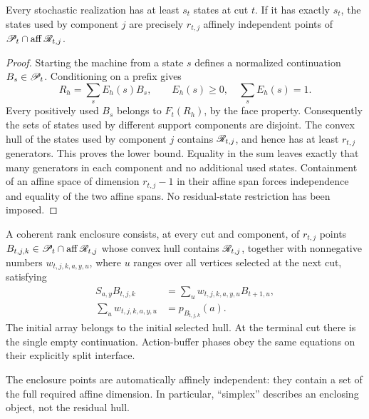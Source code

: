 \begin{lemma}\label{lem:separated}
Every stochastic realization has at least $s_t$ states at cut $t$.
If it has exactly $s_t$, the states used by component $j$ are precisely
$r_{t,j}$ affinely independent points of
$\mathscr P_t\cap\operatorname{aff}\mathscr R_{t,j}$.
\end{lemma}
\begin{proof}
Starting the machine from a state $s$ defines a normalized continuation
$B_s\in\mathscr P_t$. Conditioning on a prefix gives
\[
 R_h=\sum_s E_h(s)B_s,\qquad E_h(s)\ge0,\quad\sum_sE_h(s)=1.
\]
Every positively used $B_s$ belongs to $F_t(R_h)$, by the face property.
Consequently the sets of states used by different support components
are disjoint. The convex hull of the states used by component $j$
contains $\mathscr R_{t,j}$, and hence has at least $r_{t,j}$ generators.
This proves the lower bound. Equality in the sum leaves exactly that
many generators in each component and no additional used states.
Containment of an affine space of dimension $r_{t,j}-1$ in their
affine span forces independence and equality of the two affine spans.
No residual-state restriction has been imposed.
\end{proof}

\begin{definition}\label{def:coherent}
A coherent rank enclosure consists, at every cut and component, of
$r_{t,j}$ points $B_{t,j,k}\in\mathscr P_t\cap\operatorname{aff}\mathscr R_{t,j}$ whose convex
hull contains $\mathscr R_{t,j}$, together with nonnegative numbers
$w_{t,j,k,a,y,u}$, where $u$ ranges over all vertices selected at the
next cut, satisfying
\begin{align}
 S_{a,y}B_{t,j,k}&=\sum_u w_{t,j,k,a,y,u}B_{t+1,u},
                                      \label{eq:coherent-shift}\\
 \sum_u w_{t,j,k,a,y,u}&=p_{B_{t,j,k}}(a).
                                      \label{eq:coherent-mass}
\end{align}
The initial array belongs to the initial selected hull. At the terminal
cut there is the single empty continuation. Action-buffer phases obey
the same equations on their explicitly split interface.
\end{definition}
The enclosure points are automatically affinely independent: they
contain a set of the full required affine dimension. In particular,
``simplex'' describes an enclosing object, not the residual hull.

